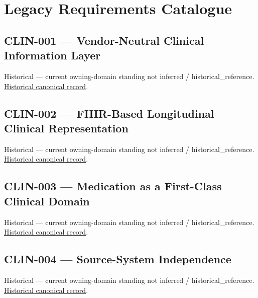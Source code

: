 \section{Legacy Requirements Catalogue}

\subsection{CLIN-001 — Vendor-Neutral Clinical Information Layer}

\par\label{element:44eec8cf17f44593824a1f723d949352}
Historical — current owning-domain standing not inferred / historical\_reference. \href{../../../../continuum/motivation/requirement/44eec8cf17f44593824a1f723d949352.md}{Historical canonical record}.\par

\subsection{CLIN-002 — FHIR-Based Longitudinal Clinical Representation}

\par\label{element:9ad88c6b7f934923800dd46c8522b9a1}
Historical — current owning-domain standing not inferred / historical\_reference. \href{../../../../continuum/motivation/requirement/9ad88c6b7f934923800dd46c8522b9a1.md}{Historical canonical record}.\par

\subsection{CLIN-003 — Medication as a First-Class Clinical Domain}

\par\label{element:f5a6dd8f23f047bb9f4c327bbd3e85f2}
Historical — current owning-domain standing not inferred / historical\_reference. \href{../../../../continuum/motivation/requirement/f5a6dd8f23f047bb9f4c327bbd3e85f2.md}{Historical canonical record}.\par

\subsection{CLIN-004 — Source-System Independence}

\par\label{element:a5a3d2ddb02d4ac4b3eabdfb2ecd22bb}
Historical — current owning-domain standing not inferred / historical\_reference. \href{../../../../continuum/motivation/requirement/a5a3d2ddb02d4ac4b3eabdfb2ecd22bb.md}{Historical canonical record}.\par

